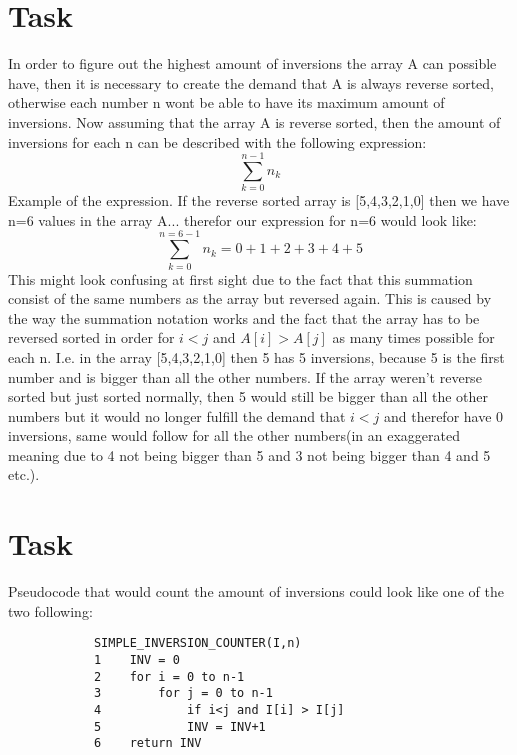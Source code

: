 \documentclass[a4paper]{article}
\begin{document}
\newpage
    \section*{Task }
        In order to figure out the highest amount of inversions the array A can possible have, then it is necessary to create the 
        demand that A is always reverse sorted, otherwise each number n wont be able to have its maximum amount of inversions. 
        Now assuming that the array A is reverse sorted, then the amount of inversions for each n can be described with the following
        expression:
 \begin{equation}
    \sum_{k=0}^{n-1} n_k
 \end{equation}
        Example of the expression. If the reverse sorted array is [5,4,3,2,1,0] then we have n=6 values in the array A... 
        therefor our expression for n=6 would look like:
        \begin{equation}
            \sum_{k=0}^{n=6-1} n_k = 0+1+2+3+4+5
        \end{equation}
        This might look confusing at first sight due to the fact that this summation consist of the same numbers as the array but reversed again.
        This is caused by the way the summation notation works and the fact that the array has to be reversed sorted in order for 
        $i<j$ and $A[i]>A[j]$ as many times possible for each n. I.e. in the array [5,4,3,2,1,0] then 5 has 5 inversions, because 5 is the first 
        number and is bigger than all the other numbers. If the array weren't reverse sorted but just sorted normally, then 5 would still be bigger
        than all the other numbers but it would no longer fulfill the demand that $i<j$ and therefor have 0 inversions, same would follow for all 
        the other numbers(in an exaggerated meaning due to 4 not being bigger than 5 and 3 not being bigger than 4 and 5 etc.).
\newpage
    \section*{Task }
        Pseudocode that would count the amount of inversions could look like one of the two following:

        \begin{verbatim} 
            SIMPLE_INVERSION_COUNTER(I,n)
            1    INV = 0
            2    for i = 0 to n-1
            3        for j = 0 to n-1
            4            if i<j and I[i] > I[j]
            5            INV = INV+1
            6    return INV
        \end{verbatim}   
\end{document}
